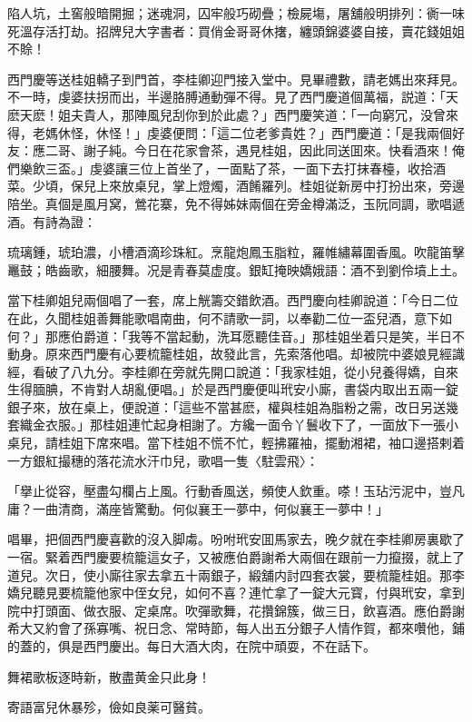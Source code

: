 陷人坑，土窖般暗開掘；迷魂洞，囚牢般巧砌疊；檢屍塲，屠舖般明排列：衠一味死溫存活打劫。招牌兒大字書者：買俏金哥哥休撦，纏頭錦婆婆自接，賣花錢姐姐不賒！

西門慶等送桂姐轎子到門首，李桂卿迎門接入堂中。見畢禮數，請老媽出來拜見。不一時，虔婆扶拐而出，半邊胳膊通動彈不得。見了西門慶道個萬福，説道：「天麽天麽！姐夫貴人，那陣風兒刮你到於此處？」西門慶笑道：「一向窮冗，没曾來得，老媽休怪，休怪！」虔婆便問：「這二位老爹貴姓？」西門慶道：「是我兩個好友：應二哥、謝子純。今日在花家會茶，遇見桂姐，因此同送囬來。快看酒來！俺們樂飲三盃。」虔婆讓三位上首坐了，一面點了茶，一面下去打抹春檯，收拾酒菜。少頃，保兒上來放桌兒，掌上燈燭，酒餚羅列。桂姐従新房中打扮出來，旁邊陪坐。真個是風月窝，鶯花寨，免不得姊妹兩個在旁金樽滿泛，玉阮同調，歌唱遞酒。有詩為證：

琉璃鍾，琥珀濃，小槽酒滴珍珠紅。烹龍炮鳳玉脂粒，羅帷繡幕圍香風。吹龍笛擊鼉鼓；皓齒歌，細腰舞。况是青春莫虚度。銀缸掩映嬌娥語：酒不到劉伶墳上土。

當下桂卿姐兒兩個唱了一套，席上觥籌交錯飲酒。西門慶向桂卿說道：「今日二位在此，久聞桂姐善舞能歌唱南曲，何不請歌一詞，以奉勸二位一盃兒酒，意下如何？」那應伯爵道：「我等不當起動，洗耳愿聽佳音。」那桂姐坐着只是笑，半日不動身。原來西門慶有心要梳籠桂姐，故發此言，先索落他唱。却被院中婆娘見經識經，看破了八九分。李桂卿在旁就先開口說道：「我家桂姐，從小兒養得嬌，自來生得腼腆，不肯對人胡亂便唱。」於是西門慶便叫玳安小廝，書袋内取出五兩一錠銀子來，放在桌上，便說道：「這些不當甚麽，權與桂姐為脂粉之需，改日另送幾套織金衣服。」那桂姐連忙起身相謝了。方纔一面令丫鬟收下了，一面放下一張小桌兒，請桂姐下席來唱。當下桂姐不慌不忙，輕拂羅袖，擺動湘裙，袖口邊搭剌着一方銀紅撮穗的落花流水汗巾兒，歌唱一隻〈駐雲飛〉：

「擧止從容，壓盡勾欄占上風。行動香風送，頻使人欽重。嗏！玉玷污泥中，豈凡庸？一曲清商，滿座皆驚動。何似襄王一夢中，何似襄王一夢中！」

唱畢，把個西門慶喜歡的沒入脚䖏。吩咐玳安囬馬家去，晚夕就在李桂卿房裏歇了一宿。緊着西門慶要梳籠這女子，又被應伯爵謝希大兩個在跟前一力攛掇，就上了道兒。次日，使小廝往家去拿五十兩銀子，緞舖内討四套衣裳，要梳籠桂姐。那李嬌兒聽見要梳籠他家中侄女兒，如何不喜？連忙拿了一錠大元寳，付與玳安，拿到院中打頭面、做衣服、定桌席。吹彈歌舞，花攢錦簇，做三日，飲喜酒。應伯爵謝希大又約會了孫寡嘴、祝日念、常時節，每人出五分銀子人情作賀，都來囋他，鋪的蓋的，俱是西門慶出。每日大酒大肉，在院中頑耍，不在話下。

舞裙歌板逐時新，散盡黄金只此身！

寄語富兒休暴殄，儉如良薬可醫貧。

